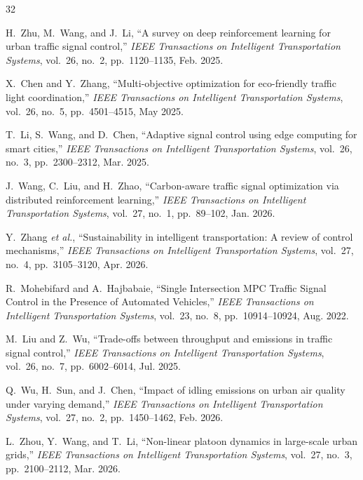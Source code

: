 \documentclass[journal]{IEEEtran}
\begin{document}
\begin{thebibliography}{32}

H.~Zhu, M.~Wang, and J.~Li, ``A survey on deep reinforcement learning for urban traffic signal control,'' \emph{IEEE Transactions on Intelligent Transportation Systems}, vol.~26, no.~2, pp.~1120--1135, Feb. 2025.

X.~Chen and Y.~Zhang, ``Multi-objective optimization for eco-friendly traffic light coordination,'' \emph{IEEE Transactions on Intelligent Transportation Systems}, vol.~26, no.~5, pp.~4501--4515, May 2025.

T.~Li, S.~Wang, and D.~Chen, ``Adaptive signal control using edge computing for smart cities,'' \emph{IEEE Transactions on Intelligent Transportation Systems}, vol.~26, no.~3, pp.~2300--2312, Mar. 2025.

J.~Wang, C.~Liu, and H.~Zhao, ``Carbon-aware traffic signal optimization via distributed reinforcement learning,'' \emph{IEEE Transactions on Intelligent Transportation Systems}, vol.~27, no.~1, pp.~89--102, Jan. 2026.

Y.~Zhang \textit{et al.}, ``Sustainability in intelligent transportation: A review of control mechanisms,'' \emph{IEEE Transactions on Intelligent Transportation Systems}, vol.~27, no.~4, pp.~3105--3120, Apr. 2026.

R.~Mohebifard and A.~Hajbabaie, ``Single Intersection MPC Traffic Signal Control in the Presence of Automated Vehicles,'' \emph{IEEE Transactions on Intelligent Transportation Systems}, vol.~23, no.~8, pp.~10914--10924, Aug. 2022.

M.~Liu and Z.~Wu, ``Trade-offs between throughput and emissions in traffic signal control,'' \emph{IEEE Transactions on Intelligent Transportation Systems}, vol.~26, no.~7, pp.~6002--6014, Jul. 2025.

Q.~Wu, H.~Sun, and J.~Chen, ``Impact of idling emissions on urban air quality under varying demand,'' \emph{IEEE Transactions on Intelligent Transportation Systems}, vol.~27, no.~2, pp.~1450--1462, Feb. 2026.

L.~Zhou, Y.~Wang, and T.~Li, ``Non-linear platoon dynamics in large-scale urban grids,'' \emph{IEEE Transactions on Intelligent Transportation Systems}, vol.~27, no.~3, pp.~2100--2112, Mar. 2026.


\end{thebibliography}
\end{document}
